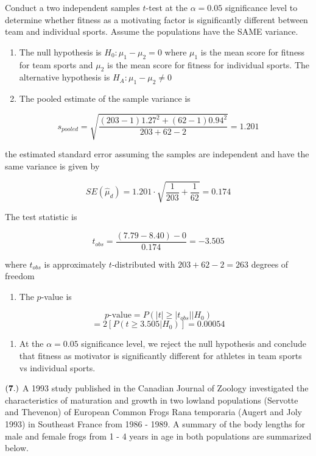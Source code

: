 \documentclass[
]{article}
\providecommand{\tightlist}{%
  \setlength{\itemsep}{0pt}\setlength{\parskip}{0pt}}
\begin{document}
Conduct a two independent samples \(t\)-test at the \(\alpha = 0.05\)
significance level to determine whether fitness as a motivating factor
is significantly different between team and individual sports. Assume
the populations have the SAME variance.

\begin{enumerate}
\def\labelenumi{\arabic{enumi}.}
\item
  {The null hypothesis is \(H_0: \mu_1 - \mu_2 = 0\) where \(\mu_1\) is
  the mean score for fitness for team sports and \(\mu_2\) is the mean
  score for fitness for individual sports. The alternative hypothesis is
  \(H_A: \mu_1 - \mu_2 \neq 0\)}
\item
  The pooled estimate of the sample variance is
\end{enumerate}

\[s_{pooled} = \sqrt{\frac{(203 - 1)1.27^2 + (62-1)0.94^2}{203+62 - 2}} = 1.201 \]

the estimated standard error assuming the samples are independent and
have the same variance is given by

\[ SE(\hat{\mu}_d) = 1.201\cdot\sqrt{\frac{1}{203}+\frac{1}{62}} = 0.174\]

The test statistic is

\[ t_{obs} = \frac{(7.79 - 8.40) - 0}{0.174} = -3.505\]

where \(t_{obs}\) is approximately \(t\)-distributed with
\(203+62 - 2 = 263\) degrees of freedom

\begin{enumerate}
\def\labelenumi{\arabic{enumi}.}
\setcounter{enumi}{2}
\tightlist
\item
  The \(p\)-value is
\end{enumerate}

\[ p\text{-value} = P(|t|\geq |t_{obs}||H_0) \]
\[= 2\left[P(t \geq 3.505 | H_0)\right] = 0.00054\]

\begin{enumerate}
\def\labelenumi{\arabic{enumi}.}
\setcounter{enumi}{3}
\tightlist
\item
  {At the \(\alpha = 0.05\) significance level, we reject the null
  hypothesis and conclude that fitness as motivator is significantly
  different for athletes in team sports vs individual sports.}
\end{enumerate}

\(\bf (7.)\) A 1993 study published in the Canadian Journal of Zoology
investigated the characteristics of maturation and growth in two lowland
populations (Servotte and Thevenon) of European Common Frogs Rana
temporaria (Augert and Joly 1993) in Southeast France from 1986 - 1989.
A summary of the body lengths for male and female frogs from 1 - 4 years
in age in both populations are summarized below.
\end{document}
